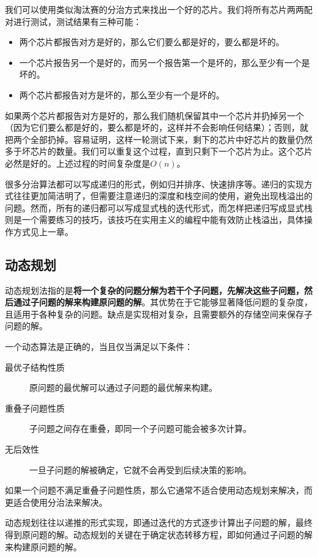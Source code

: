 \begin{answer}
    我们可以使用类似淘汰赛的分治方式来找出一个好的芯片。我们将所有芯片两两配对进行测试，测试结果有三种可能：
    \begin{itemize}
        \item 两个芯片都报告对方是好的，那么它们要么都是好的，要么都是坏的。
        \item 一个芯片报告另一个是好的，而另一个报告第一个是坏的，那么至少有一个是坏的。
        \item 两个芯片都报告对方是坏的，那么至少有一个是坏的。
    \end{itemize}

    如果两个芯片都报告对方是好的，那么我们随机保留其中一个芯片并扔掉另一个（因为它们要么都是好的，要么都是坏的，这样并不会影响任何结果）；否则，就把两个全部扔掉。容易证明，这样一轮测试下来，剩下的芯片中好芯片的数量仍然多于坏芯片的数量。我们可以重复这个过程，直到只剩下一个芯片为止。这个芯片必然是好的。上述过程的时间复杂度是$O(n)$。
\end{answer}

很多分治算法都可以写成递归的形式，例如归并排序、快速排序等。递归的实现方式往往更加简洁明了，但需要注意递归的深度和栈空间的使用，避免出现栈溢出的问题。然而，所有的递归都可以写成显式栈的迭代形式，而怎样把递归写成显式栈则是一个需要练习的技巧，该技巧在实用主义的编程中能有效防止栈溢出，具体操作方式见上一章。

\subsection{动态规划}

动态规划法指的是\textbf{将一个复杂的问题分解为若干个子问题，先解决这些子问题，然后通过子问题的解来构建原问题的解}。其优势在于它能够显著降低问题的复杂度，且适用于各种复杂的问题。缺点是实现相对复杂，且需要额外的存储空间来保存子问题的解。

一个动态算法是正确的，当且仅当满足以下条件：
\begin{description}
  \item[最优子结构性质] 原问题的最优解可以通过子问题的最优解来构建。
  \item[重叠子问题性质] 子问题之间存在重叠，即同一个子问题可能会被多次计算。
  \item[无后效性] 一旦子问题的解被确定，它就不会再受到后续决策的影响。
\end{description}
如果一个问题不满足重叠子问题性质，那么它通常不适合使用动态规划来解决，而更适合使用分治法来解决。

动态规划往往以递推的形式实现，即通过迭代的方式逐步计算出子问题的解，最终得到原问题的解。动态规划的关键在于确定状态转移方程，即如何通过子问题的解来构建原问题的解。

